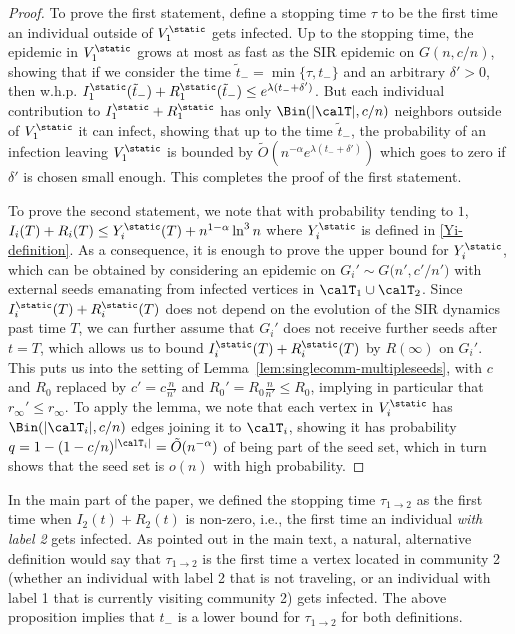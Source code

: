 \documentclass[11pt]{article}
\begin{document}
\begin{proof}
To prove the first statement, define a stopping time $\tau$ to be the first time an individual outside of $V_1^\static$ gets infected.  Up to the stopping time, the epidemic in 
 $V_1^\static$ grows at most as fast as the SIR epidemic on $G(n,c/n)$, showing that if we consider the time $\tilde t_-=\min\{\tau,t_-\}$ and an arbitrary
 $\delta'>0$, then 
 w.h.p. $I_1^\static(\tilde t_-)+R_1^\static(\tilde t_-)\leq e^{\lambda (t_-+\delta')}$.
 But each individual contribution to $I_1^\static+R_1^\static$
has only 
$\Bin(|\calT|,c/n)$ neighbors outside of  $V_1^\static$ it can infect, showing that up to the time
$\tilde t_-$, the probability of an infection leaving  $V_1^\static$ is bounded by
$\tilde O(n^{-\alpha} e^{\lambda (t_-+\delta')})$ which goes to zero if $\delta'$ is chosen small enough.
This completes the proof of the first statement.

To prove the second statement, we note that 
with probability tending to $1$,  $I_i(T) + R_i(T)\leq Y_i^\static(T) + n^{1-\alpha}\ln^3 n$ where $Y_i^\static$ is defined in \eqref{Yi-definition}. As a consequence, it is enough to prove the upper bound for 
$Y_i^\static$, which can be obtained by considering an epidemic on
$G_i' \sim G\bigl(n', c'/n'\bigr)$ with external seeds emanating from infected vertices in ${\calT}_1\cup\calT_2$.
Since $I_i^{\static}(T)+R_i^{\static}(T)$ does not depend on the evolution of the SIR dynamics past time $T$, we can further assume that $G_i'$ does not receive further seeds after $t=T$, which allows us to bound $I_i^{\static}(T)+R_i^{\static}(T)$ by $R(\infty)$ on $G_i'$.
This puts us into the setting of Lemma~\ref{lem:singlecomm-multipleseeds}, with $c$ and $R_0$ replaced by
$c'=c\frac n{n'}$ and $R_0'=R_0\frac n{n'}\leq R_0$, implying in particular that $r_\infty'\leq r_\infty$.  To apply the lemma, we note that each vertex in $V_i^\static$ has $\Bin(|\calT_i|,c/n)$ edges joining it to 
$\calT_i$, showing it has probability $q=1-(1-c/n)^{|\calT_i|}=\tilde O(n^{-\alpha})$ of being part of the seed set, which in turn shows that the seed set is $o(n)$ with high probability.
\end{proof}
\begin{remark}\label{rem:tau12-lower}
In the main part of the paper, we defined the stopping time $\tau_{1\to 2}$ as the first time when  $I_2(t)+R_2(t)$ is non-zero, i.e.,  the first time an individual {\it with label 2} gets infected.  As pointed out in the main text, a natural, alternative definition would say that  $\tau_{1\to 2}$ is the first time a vertex located in community 2 (whether an individual with label 2 that is not traveling, or an individual with label 1 that is currently visiting community 2) gets infected.  The above proposition implies that $t_-$ is a lower bound for $\tau_{1\to 2}$ for both definitions.
\end{remark}
\end{document}
